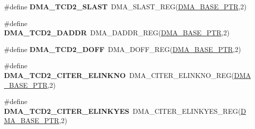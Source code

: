 \begin{DoxyCompactItemize}
\item 
\hypertarget{group___d_m_a___register___accessor___macros_gaa05cc6cdf9d615cc8fdcaae8878e71c2}{}\#define {\bfseries D\+M\+A\+\_\+\+T\+C\+D2\+\_\+\+S\+L\+A\+S\+T}~D\+M\+A\+\_\+\+S\+L\+A\+S\+T\+\_\+\+R\+E\+G(\hyperlink{group___d_m_a___peripheral_ga6997fbc1b1973e9f27170217a3bd6f22}{D\+M\+A\+\_\+\+B\+A\+S\+E\+\_\+\+P\+T\+R},2)\label{group___d_m_a___register___accessor___macros_gaa05cc6cdf9d615cc8fdcaae8878e71c2}

\item 
\hypertarget{group___d_m_a___register___accessor___macros_ga2c9b29c3d17e214a72000e9c5920978f}{}\#define {\bfseries D\+M\+A\+\_\+\+T\+C\+D2\+\_\+\+D\+A\+D\+D\+R}~D\+M\+A\+\_\+\+D\+A\+D\+D\+R\+\_\+\+R\+E\+G(\hyperlink{group___d_m_a___peripheral_ga6997fbc1b1973e9f27170217a3bd6f22}{D\+M\+A\+\_\+\+B\+A\+S\+E\+\_\+\+P\+T\+R},2)\label{group___d_m_a___register___accessor___macros_ga2c9b29c3d17e214a72000e9c5920978f}

\item 
\hypertarget{group___d_m_a___register___accessor___macros_ga591bcfc8b6f9965d6ca5ff3ebcb1af5e}{}\#define {\bfseries D\+M\+A\+\_\+\+T\+C\+D2\+\_\+\+D\+O\+F\+F}~D\+M\+A\+\_\+\+D\+O\+F\+F\+\_\+\+R\+E\+G(\hyperlink{group___d_m_a___peripheral_ga6997fbc1b1973e9f27170217a3bd6f22}{D\+M\+A\+\_\+\+B\+A\+S\+E\+\_\+\+P\+T\+R},2)\label{group___d_m_a___register___accessor___macros_ga591bcfc8b6f9965d6ca5ff3ebcb1af5e}

\item 
\hypertarget{group___d_m_a___register___accessor___macros_gaa7002957f90bec11cfb5acbdafd3c3b2}{}\#define {\bfseries D\+M\+A\+\_\+\+T\+C\+D2\+\_\+\+C\+I\+T\+E\+R\+\_\+\+E\+L\+I\+N\+K\+N\+O}~D\+M\+A\+\_\+\+C\+I\+T\+E\+R\+\_\+\+E\+L\+I\+N\+K\+N\+O\+\_\+\+R\+E\+G(\hyperlink{group___d_m_a___peripheral_ga6997fbc1b1973e9f27170217a3bd6f22}{D\+M\+A\+\_\+\+B\+A\+S\+E\+\_\+\+P\+T\+R},2)\label{group___d_m_a___register___accessor___macros_gaa7002957f90bec11cfb5acbdafd3c3b2}

\item 
\hypertarget{group___d_m_a___register___accessor___macros_ga63cb3dda75d3169276a55872ec2ac0a3}{}\#define {\bfseries D\+M\+A\+\_\+\+T\+C\+D2\+\_\+\+C\+I\+T\+E\+R\+\_\+\+E\+L\+I\+N\+K\+Y\+E\+S}~D\+M\+A\+\_\+\+C\+I\+T\+E\+R\+\_\+\+E\+L\+I\+N\+K\+Y\+E\+S\+\_\+\+R\+E\+G(\hyperlink{group___d_m_a___peripheral_ga6997fbc1b1973e9f27170217a3bd6f22}{D\+M\+A\+\_\+\+B\+A\+S\+E\+\_\+\+P\+T\+R},2)\label{group___d_m_a___register___accessor___macros_ga63cb3dda75d3169276a55872ec2ac0a3}


\end{DoxyCompactItemize}

